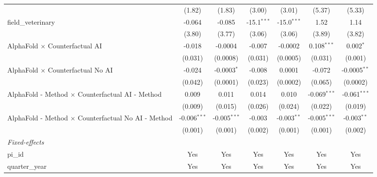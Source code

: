 \begin{tabular}{lcccccc}
                                                               & (1.82)         & (1.83)         & (3.00)        & (3.01)        & (5.37)         & (5.33)\\   
   field\_veterinary                                           & -0.064         & -0.085         & -15.1$^{***}$ & -15.0$^{***}$ & 1.52           & 1.14\\   
                                                               & (3.80)         & (3.77)         & (3.06)        & (3.06)        & (3.89)         & (3.82)\\   
   AlphaFold $\times$ Counterfactual AI                        & -0.018         & -0.0004        & -0.007        & -0.0002       & 0.108$^{***}$  & 0.002$^{*}$\\   
                                                               & (0.031)        & (0.0008)       & (0.031)       & (0.0005)      & (0.031)        & (0.001)\\   
   AlphaFold $\times$ Counterfactual No AI                     & -0.024         & -0.0003$^{*}$  & -0.008        & 0.0001        & -0.072         & -0.0005$^{**}$\\   
                                                               & (0.042)        & (0.0001)       & (0.023)       & (0.0002)      & (0.065)        & (0.0002)\\   
   AlphaFold - Method $\times$ Counterfactual AI - Method      & 0.009          & 0.011          & 0.014         & 0.010         & -0.069$^{***}$ & -0.061$^{***}$\\   
                                                               & (0.009)        & (0.015)        & (0.026)       & (0.024)       & (0.022)        & (0.019)\\   
   AlphaFold - Method $\times$ Counterfactual No AI - Method   & -0.006$^{***}$ & -0.005$^{***}$ & -0.003        & -0.003$^{**}$ & -0.005$^{***}$ & -0.003$^{**}$\\   
                                                               & (0.001)        & (0.001)        & (0.002)       & (0.001)       & (0.001)        & (0.002)\\   
   \midrule
   \emph{Fixed-effects}\\
   pi\_id                                                      & Yes            & Yes            & Yes           & Yes           & Yes            & Yes\\  
   quarter\_year                                               & Yes            & Yes            & Yes           & Yes           & Yes            & Yes\\  

\end{tabular}
